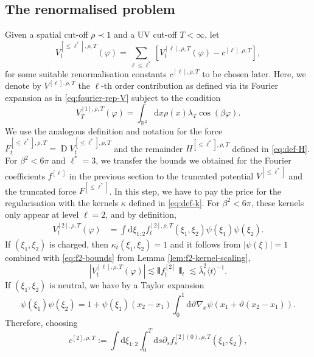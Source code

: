 \documentclass[11pt, a4paper]{scrartcl}
\numberwithin{equation}{section}
\theoremstyle{plain}
\theoremstyle{remark}
\newcommand{\assign}{:=}
\newcommand{\mathd}{\mathrm{d}}
\newcommand{\tmop}[1]{\ensuremath{\operatorname{#1}}}
\begin{document}
\subsection{The renormalised problem}\label{sec:definitions}

Given a spatial cut-off $\rho \prec 1$ and a UV cut-off $T < \infty$, let
\begin{equation}
	V_t^{[\leqslant \ell^{\ast}], \rho, T} (\varphi) = \sum_{\ell \leqslant
		\ell^{\ast}} [V^{[\ell], \rho, T}_t (\varphi) - c^{[\ell], \rho, T}],
	\label{eq:def-V}
\end{equation}
for some suitable renormalisation constants $c^{[\ell], \rho, T}$ to be chosen
later. Here, we denote by $V^{[\ell], \rho, T}$ the $\ell$-th order
contribution as defined via its Fourier expansion as in
\eqref{eq:fourier-rep-V} subject to the condition
\[ V_T^{[1], \rho, T} (\varphi) = \int_{\mathbb{R}^2} \mathd x \rho (x)
	\lambda_T \cos (\beta \varphi) . \]
We use the analogous definition and notation for the force $F^{[\leqslant
					\ell^{\ast}], \rho, T}_t = \tmop{D} V_t^{[\leqslant \ell^{\ast}], \rho, T}$ and the
remainder $H^{[\leqslant \ell^{\ast}], \rho, T}$ defined in \eqref{eq:def-H}.
For $\beta^2 < 6 \pi$ and $\ell^{\ast} = 3$, we transfer the bounds we
obtained for the Fourier coefficients $f^{[\ell]}$ in the previous section to
the truncated potential $V^{[\leqslant \ell^{\ast}]}$ and the truncated force
$F^{[\leqslant \ell^{\ast}]}$. In this step, we have to pay the price for the
regularisation with the kernels $\kappa$ defined in \eqref{eq:def-k}. For $\beta^2
	< 6 \pi$, these kernels only appear at level $\ell = 2$, and by definition,
\[ \begin{aligned}
		V^{[2], \rho, T}_t (\varphi) & =
		\int \mathd \xi_{1 : 2} f_t^{[2], \rho, T} (\xi_1,
		\xi_2) \psi (\xi_1) \psi (\xi_2) .
	\end{aligned} \]
If $(\xi_1, \xi_2)$ is charged, then $\kappa_t (\xi_1, \xi_2) = 1$ and it follows
from $| \psi (\xi) | = 1$ combined with \eqref{eq:f2-bounds} from Lemma
\ref{lem:f2-kernel-scaling},
\[ | V^{[\ell], \rho, T}_t (\varphi) | \lesssim \interleave f^{[2]}_t
	\interleave_t \lesssim \bar{\lambda}_t^2 \langle t \rangle^{- 1} . \]
If $(\xi_1, \xi_2)$ is neutral, we have by a Taylor expansion
\begin{equation}
	\psi (\xi_1) \psi (\xi_2) = 1 + \psi (\xi_1) (x_2 - x_1)  \int_0^1 \mathd
	\vartheta \nabla_x \psi (x_1 + \vartheta (x_2 - x_1)) .
	\label{eq:exp-taylor}
\end{equation}
Therefore, choosing
\begin{equation}\label{eq:def-counterterm}
	c^{[2], \rho, T} \assign  \int \mathd \xi_{1 : 2}
	\int_0^T \mathd s \partial_s{f}_s^{[2] (0), \rho, T} (\xi_1, \xi_2),
\end{equation}
\end{document}
